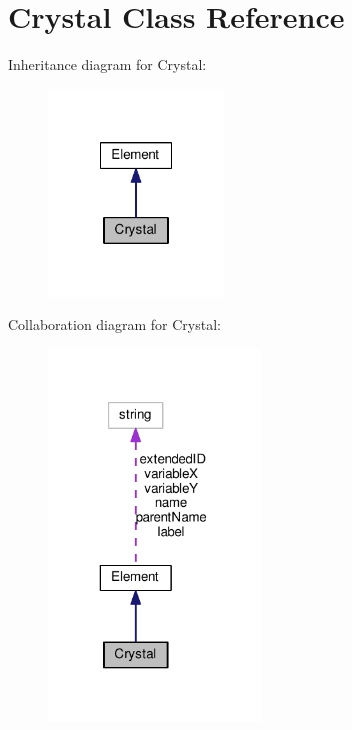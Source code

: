 \hypertarget{classCrystal}{\section{Crystal Class Reference}
\label{classCrystal}
}


Inheritance diagram for Crystal\+:\nopagebreak
\begin{figure}[H]
\begin{center}
\leavevmode
\includegraphics[width=132pt]{classCrystal__inherit__graph}
\end{center}
\end{figure}


Collaboration diagram for Crystal\+:\nopagebreak
\begin{figure}[H]
\begin{center}
\leavevmode
\includegraphics[width=160pt]{classCrystal__coll__graph}
\end{center}
\end{figure}
